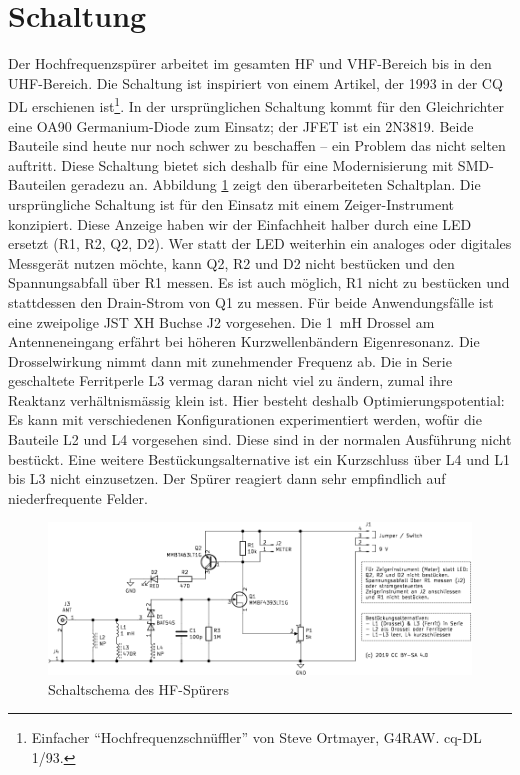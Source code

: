 \documentclass[a4paper,11pt,halfparskip,smallheadings,DIV=10]{scrartcl}
\begin{document}
\section{Schaltung}
Der Hochfrequenzspürer arbeitet im gesamten HF und VHF-Bereich bis
in den UHF-Bereich. Die Schaltung ist inspiriert von einem 
Artikel, der 1993 in der CQ DL erschienen ist\footnote{Einfacher
``Hochfrequenzschnüffler'' von Steve Ortmayer, G4RAW. cq-DL 1/93.}. In der
ursprünglichen Schaltung kommt für den Gleichrichter eine OA90 Germanium-Diode
zum Einsatz; der JFET ist ein 2N3819. Beide Bauteile sind heute nur noch schwer
zu beschaffen -- ein Problem das nicht selten auftritt. Diese Schaltung bietet
sich deshalb für eine Modernisierung mit SMD-Bauteilen geradezu an. Abbildung
\ref{fig:schematic} zeigt den überarbeiteten Schaltplan. Die ursprüngliche
Schaltung ist für den Einsatz mit einem Zeiger-Instrument konzipiert. Diese
Anzeige haben wir der Einfachheit halber durch eine LED ersetzt (R1, R2, Q2, D2).
Wer statt der LED weiterhin ein analoges oder digitales Messgerät nutzen
möchte, kann Q2, R2 und D2 nicht bestücken und den Spannungsabfall über
R1 messen. Es ist auch möglich, R1 nicht zu bestücken und stattdessen
den Drain-Strom von Q1 zu messen. Für beide Anwendungsfälle ist eine zweipolige JST XH
Buchse J2 vorgesehen. Die 1~mH Drossel am Antenneneingang erfährt bei höheren
Kurzwellenbändern Eigenresonanz. Die Drosselwirkung nimmt dann mit zunehmender
Frequenz ab. Die in Serie geschaltete Ferritperle L3 vermag daran nicht viel
zu ändern, zumal ihre Reaktanz verhältnismässig klein ist. Hier besteht deshalb
Optimierungspotential: Es kann mit verschiedenen Konfigurationen experimentiert
werden, wofür die Bauteile L2 und L4 vorgesehen sind. Diese sind in der
normalen Ausführung nicht bestückt. Eine weitere Bestückungsalternative ist
ein Kurzschluss über L4 und L1 bis L3 nicht einzusetzen. Der Spürer reagiert dann sehr
empfindlich auf niederfrequente Felder.

\begin{figure}
\includegraphics[width=\textwidth]{schaltung.pdf}
\caption{Schaltschema des HF-Spürers}
\label{fig:schematic}
\end{figure}
\end{document}
